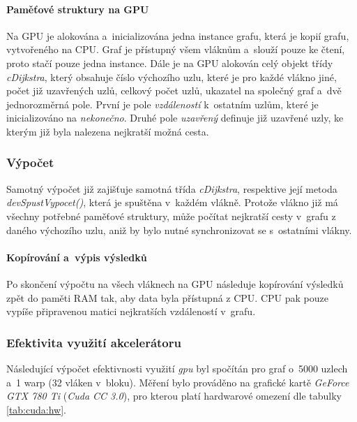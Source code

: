 \paragraph{Paměťové struktury na GPU}
Na GPU je alokována a~inicializována jedna instance grafu, která je kopií grafu, vytvořeného na CPU. Graf je přístupný všem vláknům a~slouží pouze ke čtení, proto stačí pouze jedna instance. Dále je na GPU alokován celý objekt třídy \textit{cDijkstra}, který obsahuje číslo výchozího uzlu, které je pro každé vlákno jiné, počet již uzavřených uzlů, celkový počet uzlů, ukazatel na společný graf a~dvě jednorozměrná pole. První je pole \textit{vzdáleností} k~ostatním uzlům, které je inicializováno na \textit{nekonečno}. Druhé pole \textit{uzavřený} definuje již uzavřené uzly, ke kterým již byla nalezena nejkratší možná cesta.



\subsubsection{Výpočet}
Samotný výpočet již zajišťuje samotná třída \textit{cDijkstra}, respektive její metoda \textit{devSpustVypocet()}, která je spuštěna v~každém vlákně. Protože vlákno již má všechny potřebné paměťové struktury, může počítat nejkratší cesty v~grafu z daného výchozího uzlu, aniž by bylo nutné synchronizovat se s~ostatními vlákny.

\paragraph{Kopírování a~výpis výsledků}
Po skončení výpočtu na všech vláknech na GPU následuje kopírování výsledků zpět do paměti RAM tak, aby data byla přístupná z CPU. CPU pak pouze vypíše připravenou matici nejkratších vzdáleností v~grafu.


\subsubsection{Efektivita využití akcelerátoru} \label{l:cuda:dijkstra:efektivita}
Následující výpočet efektivnosti využití \emph{gpu} byl spočítán pro graf o~5000 uzlech a~1 warp (32 vláken v~bloku).
Měření bylo prováděno na grafické kartě \emph{GeForce GTX 780 Ti} (\emph{Cuda CC 3.0}), pro kterou platí hardwarové omezení 
dle tabulky \ref{tab:cuda:hw}.

